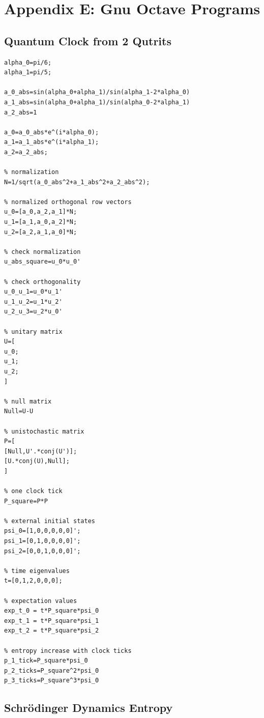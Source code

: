 \documentclass[12pt]{article}
\begin{document}
\newpage
\section{Appendix E: Gnu Octave Programs}

\subsection{Quantum Clock from 2 Qutrits}
\begin{verbatim}
alpha_0=pi/6;
alpha_1=pi/5;

a_0_abs=sin(alpha_0+alpha_1)/sin(alpha_1-2*alpha_0)
a_1_abs=sin(alpha_0+alpha_1)/sin(alpha_0-2*alpha_1)
a_2_abs=1

a_0=a_0_abs*e^(i*alpha_0);
a_1=a_1_abs*e^(i*alpha_1);
a_2=a_2_abs;

% normalization
N=1/sqrt(a_0_abs^2+a_1_abs^2+a_2_abs^2);

% normalized orthogonal row vectors
u_0=[a_0,a_2,a_1]*N;
u_1=[a_1,a_0,a_2]*N;
u_2=[a_2,a_1,a_0]*N;

% check normalization
u_abs_square=u_0*u_0'

% check orthogonality
u_0_u_1=u_0*u_1'
u_1_u_2=u_1*u_2'
u_2_u_3=u_2*u_0'

% unitary matrix
U=[
u_0;
u_1;
u_2;
]

% null matrix
Null=U-U

% unistochastic matrix
P=[
[Null,U'.*conj(U')];
[U.*conj(U),Null];
]

% one clock tick
P_square=P*P

% external initial states
psi_0=[1,0,0,0,0,0]';
psi_1=[0,1,0,0,0,0]';
psi_2=[0,0,1,0,0,0]';

% time eigenvalues
t=[0,1,2,0,0,0];

% expectation values
exp_t_0 = t*P_square*psi_0
exp_t_1 = t*P_square*psi_1
exp_t_2 = t*P_square*psi_2

% entropy increase with clock ticks
p_1_tick=P_square*psi_0
p_2_ticks=P_square^2*psi_0
p_3_ticks=P_square^3*psi_0
\end{verbatim}

\subsection{Schrödinger Dynamics Entropy}
\end{document}
